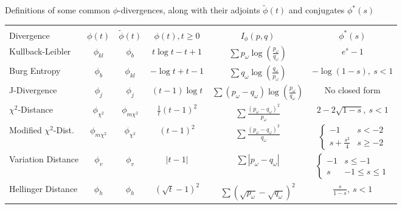 \documentclass[opre,nonblindrev]{informs3} %
\begin{document}
\begin{table}
	\TABLE
	{
		Definitions of some common $\phi$-divergences, along with their adjoints $\tilde{\phi}(t)$ and conjugates $\phi^*(s)$
		\label{tb:phi_definitions}
	}
	{\begin{tabular}{lccccc}
		\hline \\
		Divergence                        & $\phi(t)$          & $\tilde{\phi}(t)$               & $\phi(t), t \geq 0$   & $I_\phi(p,q)$     & $\phi^*(s)$ \\
		\hline
		Kullback-Leibler                 & $\phi_{kl}$        & $\phi_b$                        & $t\log t - t + 1$     & $\sum p_\omega \log\left(\frac{p_\omega}{q_\omega}\right)$ & $e^s - 1$ \\
		Burg Entropy                      & $\phi_b$           & $\phi_{kl}$                     & $-\log t + t - 1$     & $\sum q_\omega \log\left(\frac{q_\omega}{p_\omega}\right)$ & $-\log(1-s),\ s < 1$  \\
		J-Divergence                      & $\phi_j$           & $\phi_j$                        & $(t-1)\log t$         & $\sum (p_\omega - q_\omega) \log\left(\frac{p_\omega}{q_\omega}\right)$ & No closed form \\
		$\chi^2$-Distance                 & $\phi_{\chi^2}$    & $\phi_{m\chi^2}$                & $\frac{1}{t} (t-1)^2$ & $\sum \frac{(p_\omega-q_\omega)^2}{p_\omega}$              & $2 - 2\sqrt{1-s},\ s < 1$  \\
		Modified $\chi^2$-Dist.           & $\phi_{m\chi^2}$   & $\phi_{\chi^2}$                 & $(t-1)^2$             & $\sum \frac{(p_\omega - q_\omega)^2}{q_\omega}$            & $\begin{cases} -1 & s < -2 \\ s + \frac{s^2}{4} & s \geq -2 \end{cases}$ \\
		Variation Distance                & $\phi_v$           & $\phi_v$                        & $|t-1|$               & $\sum |p_\omega - q_\omega|$                               & $\begin{cases} -1 & s \leq -1 \\ s & -1 \leq s \leq 1 \end{cases}$ \\
		Hellinger Distance                & $\phi_h$           & $\phi_h$                        & $(\sqrt{t} - 1)^2$    & $\sum (\sqrt{p_\omega} - \sqrt{q_\omega})^2$               & $\frac{s}{1-s},\ s < 1$ \\
	\hline
	\end{tabular}}
	{}
\end{table}
\end{document}
